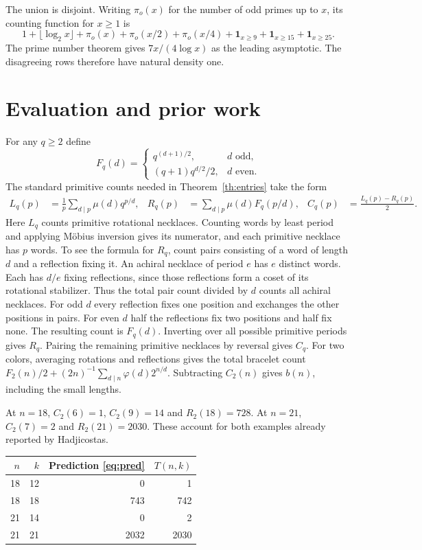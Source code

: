 \documentclass[11pt,letterpaper]{article}
\newcommand{\one}{\mathbf 1}
\begin{document}
The union is disjoint. Writing $\pi_o(x)$ for the number of odd primes up to $x$, its counting function for $x\ge1$ is
\[
 1+\lfloor\log_2 x\rfloor+\pi_o(x)+\pi_o(x/2)+\pi_o(x/4)
           +\one_{x\ge9}+\one_{x\ge15}+\one_{x\ge25}.
\]
The prime number theorem gives $7x/(4\log x)$ as the leading asymptotic. The disagreeing rows therefore have natural density one.

\newpage
\section{Evaluation and prior work}\label{sec:count}
For any $q\ge2$ define
\[
 F_q(d)=\begin{cases}q^{(d+1)/2},& d\text{ odd},\\
 (q+1)q^{d/2}/2,& d\text{ even}.
 \end{cases}
\]
The standard primitive counts needed in Theorem~\ref{th:entries} take the form
\begin{align*}
 L_q(p)&=\frac1p\sum_{d\mid p}\mu(d)q^{p/d},
 &R_q(p)&=\sum_{d\mid p}\mu(d)F_q(p/d),
 &C_q(p)&=\frac{L_q(p)-R_q(p)}2 .
\end{align*}
Here $L_q$ counts primitive rotational necklaces. Counting words by least period and applying Möbius inversion gives its numerator, and each primitive necklace has $p$ words. To see the formula for $R_q$, count pairs consisting of a word of length $d$ and a reflection fixing it. An achiral necklace of period $e$ has $e$ distinct words. Each has $d/e$ fixing reflections, since those reflections form a coset of its rotational stabilizer. Thus the total pair count divided by $d$ counts all achiral necklaces. For odd $d$ every reflection fixes one position and exchanges the other positions in pairs. For even $d$ half the reflections fix two positions and half fix none. The resulting count is $F_q(d)$. Inverting over all possible primitive periods gives $R_q$. Pairing the remaining primitive necklaces by reversal gives $C_q$. For two colors, averaging rotations and reflections gives the total bracelet count $F_2(n)/2+(2n)^{-1}\sum_{d\mid n}\varphi(d)2^{n/d}$. Subtracting $C_2(n)$ gives $b(n)$, including the small lengths.

At $n=18$, $C_2(6)=1$, $C_2(9)=14$ and $R_2(18)=728$. At $n=21$, $C_2(7)=2$ and $R_2(21)=2030$. These account for both examples already reported by Hadjicostas.
\begin{center}
\begin{tabular}{@{}rrrr@{}}\toprule
$n$ & $k$ & Prediction \eqref{eq:pred} & $T(n,k)$\\\midrule
18 & 12 & 0 & 1\\
18 & 18 & 743 & 742\\
21 & 14 & 0 & 2\\
21 & 21 & 2032 & 2030\\\bottomrule
\end{tabular}
\end{center}
\end{document}
